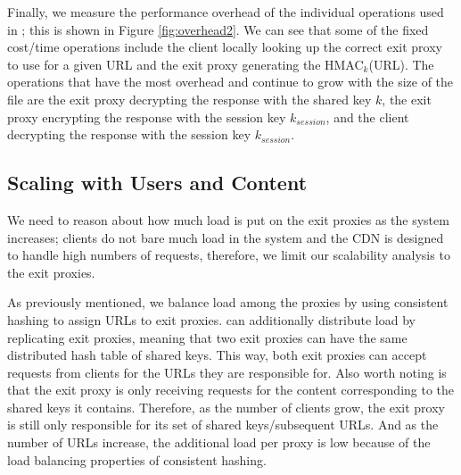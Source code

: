 
Finally, we measure the performance overhead of the individual operations used in
\system{}; this is shown in Figure \ref{fig:overhead2}. %
We can see that some of the fixed cost/time 
operations include the client locally looking up the correct exit proxy to use for a given URL and the exit proxy generating the 
HMAC$_{k}$(URL).  The operations that have the most overhead and continue to grow with the size of the file are the exit proxy decrypting 
the response with the shared key $k$, the exit proxy encrypting the response with the session key $k_{session}$, and the client 
decrypting the response with the session key $k_{session}$.


\subsection{Scaling with Users and Content}
\label{sec:scalability}

We need to reason about how much load is put on the exit proxies as the 
system increases; clients do not bare much load in the system and the CDN is designed
to handle high numbers of requests, therefore, we limit our scalability analysis to the exit proxies.  

As previously mentioned, we balance load among the proxies by using consistent hashing to assign URLs to 
exit proxies.  \system{} can additionally distribute load by replicating exit proxies, meaning that two exit proxies can 
have the same distributed hash table of shared keys.  This way, both exit proxies can accept requests from clients for 
the URLs they are responsible for.  Also worth noting is that the exit proxy is only receiving requests for the content 
corresponding to the shared keys it contains.  Therefore, as the number of clients grow, the exit proxy is still only responsible 
for its set of shared keys/subsequent URLs.  And as the number of URLs increase, the additional load per proxy is low because of the load balancing properties of consistent hashing.  %
